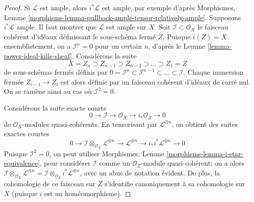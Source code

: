 \begin{proof}
Si $\mathcal{L}$ est ample, alors $i^*\mathcal{L}$ est ample, par
exemple d'après Morphismes, Lemme
\ref{morphisms-lemma-pullback-ample-tensor-relatively-ample}.
Supposons $i^*\mathcal{L}$ ample. Il faut montrer que $\mathcal{L}$
est ample sur $X$.
Soit $\mathcal{I} \subset \mathcal{O}_X$ le faisceau cohérent d'idéaux
définissant le sous-schéma fermé $Z$. Puisque $i(Z) = X$ ensemblistement,
on a $\mathcal{I}^n = 0$ pour un certain $n$, d'après le
Lemme \ref{lemma-power-ideal-kills-sheaf}.
Considérons la suite
$$
X = Z_n \supset Z_{n - 1} \supset Z_{n - 2} \supset \ldots \supset Z_1 = Z
$$
de sous-schémas fermés définis par
$0 = \mathcal{I}^n \subset \mathcal{I}^{n - 1} \subset \ldots \subset
\mathcal{I}$. Chaque immersion fermée $Z_{i - 1} \to Z_{i}$
est alors définie par un faisceau cohérent d'idéaux de carré nul.
On se ramène ainsi au cas où $\mathcal{I}^2 = 0$.

\medskip\noindent
Considérons la suite exacte courte
$$
0 \to \mathcal{I} \to \mathcal{O}_X \to i_*\mathcal{O}_Z \to 0
$$
de $\mathcal{O}_X$-modules quasi-cohérents. En tensorisant par
$\mathcal{L}^{\otimes n}$, on obtient des suites exactes courtes
\begin{equation}
\label{equation-ses}
0 \to \mathcal{I} \otimes_{\mathcal{O}_X} \mathcal{L}^{\otimes n}
\to \mathcal{L}^{\otimes n} \to i_*i^*\mathcal{L}^{\otimes n} \to 0
\end{equation}
Puisque $\mathcal{I}^2 = 0$, on peut utiliser
Morphismes, Lemme \ref{morphisms-lemma-i-star-equivalence},
pour considérer $\mathcal{I}$ comme un $\mathcal{O}_Z$-module quasi-cohérent;
on a alors $\mathcal{I} \otimes_{\mathcal{O}_X} \mathcal{L}^{\otimes n} =
\mathcal{I} \otimes_{\mathcal{O}_Z} i^*\mathcal{L}^{\otimes n}$,
avec un abus de notation évident.
De plus, la cohomologie de ce faisceau sur $Z$ s'identifie canoniquement
à sa cohomologie sur $X$ (puisque $i$ est un
homéomorphisme).


\end{proof}

